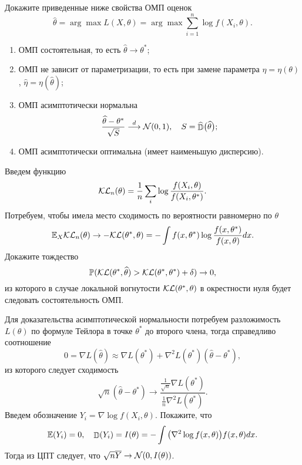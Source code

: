 \begin{problem}
Докажите приведенные ниже свойства ОМП оценок 
\[
\widehat{\theta} = \arg\max L(X, \theta) = \arg\max  \sum_{i=1}^{n} \log f(X_i, \theta).
\]
\begin{enumerate}
\item ОМП состоятельная, то есть $\widehat{\theta} \to \theta^*$;
\item ОМП не зависит от параметризации, то есть  при замене параметра $\eta = \eta(\theta)$, $\widehat{\eta} = \eta(\widehat{\theta})$;
\item ОМП асимптотически нормальна 
\[
\frac{\widehat{\theta} - \theta^*}{\sqrt{S}} \overset{d}{\longrightarrow} \mathcal{N}(0, 1),
\quad
S  = \widehat{\mathop{\mathbb{D}}\nolimits}\big(\widehat{\theta}\big);
\]
\item ОМП асимптотически оптимальна (имеет наименьшую дисперсию). 
\end{enumerate}

\begin{ordre}
Введем функцию 
\[
\mathcal{KL}_n(\theta) = \frac{1}{n} \sum_{i} \log \frac{f(X_i, \theta)}{f(X_i, \theta^*)}.
\]
Потребуем, чтобы имела место сходимость по вероятности равномерно по $\theta$
\[
\mathrm{{\mathbb E}}_X \mathcal{KL}_n(\theta) \to - \mathcal{KL}(\theta^*, \theta) =  - \int f(x, \theta^*)  \log \frac{f(x, \theta^*)}{f(x, \theta)} dx.
\]
Докажите тождество
\[
\mathrm{{\mathbb P}}(\mathcal{KL}(\theta^*, \widehat{\theta}) > \mathcal{KL}(\theta^*, \theta^*) + \delta ) \to 0,
\]
из которого в случае локальной вогнутости $\mathcal{KL}(\theta^*, \theta)$ в окрестности нуля будет следовать состоятельность ОМП.

Для доказательства асимптотической нормальности потребуем разложимость $L(\theta)$ по формуле Тейлора в точке $\theta^*$ до второго члена, тогда справедливо соотношение
\[
 0 = \nabla L(\widehat{\theta}) \approx \nabla L(\theta^*) + \nabla^2 L(\theta^*) (\widehat{\theta} - \theta^*), 
\]
из которого следует сходимость 
\[
\sqrt{n} (\widehat{\theta} - \theta^*) \to \frac{ \frac{1}{\sqrt{n}} \nabla L(\theta^*) } { \frac{1}{n} \nabla^2 L(\theta^*) }. 
\]
Введем обозначение $Y_i = \nabla \log f(X_i, \theta)$. Покажите, что 
\[
\mathrm{{\mathbb E}} (Y_i) = 0, \quad
\mathop{\mathbb{D}}\nolimits (Y_i)  = I(\theta) = - \int \big(\nabla^2 \log f(x, \theta) \big) f(x, \theta) dx.
\]
Тогда из ЦПТ следует, что $\sqrt{n} \overline{Y} \to \mathcal{N}(0, I(\theta))$.   

\end{ordre}

\end{problem}

